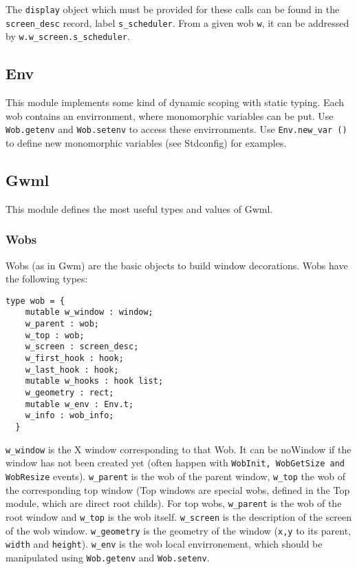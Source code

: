 \documentclass{book}
\begin{document}
 The {\tt display} object which must be provided for these calls can be
found in the {\tt screen\_desc} record, label {\tt s\_scheduler}. From a
given wob {\tt w}, it can be addressed by
 {\tt w.w\_screen.s\_scheduler}.

\subsection{\bf Env}

This module implements some kind of dynamic scoping with
static typing. Each wob contains an envirronment, where monomorphic
variables can be put. Use {\tt Wob.getenv} and {\tt Wob.setenv} to access
these envirronments. Use {\tt Env.new\_var ()} to define new monomorphic 
variables (see Stdconfig) for examples.

\subsection{\bf Gwml}


This module defines the most useful types and values  of Gwml.

\subsubsection{Wobs}

Wobs (as in Gwm) are the basic objects to build window decorations.
Wobs have the following types:

\begin{verbatim}
type wob = {
    mutable w_window : window;
    w_parent : wob;
    w_top : wob;
    w_screen : screen_desc;
    w_first_hook : hook;
    w_last_hook : hook;
    mutable w_hooks : hook list;
    w_geometry : rect;
    mutable w_env : Env.t;
    w_info : wob_info;
  }
\end{verbatim}

  {\tt w\_window} is the X window corresponding to that Wob. It can be noWindow
if the window has not been created yet (often happen with {\tt WobInit, WobGetSize
and WobResize} events). {\tt w\_parent} is the wob of the parent window,
{\tt w\_top} the wob of the corresponding top window (Top windows are special
wobs, defined in the Top module, which are direct root childs). For top 
wobs, {\tt w\_parent} is the wob of the root window and {\tt w\_top} is the
wob itself. {\tt w\_screen} is the description of the screen of the wob window.
{\tt w\_geometry} is the geometry of the window ({\tt x,y} to its parent, {
\tt width} and {\tt height}). {\tt w\_env} is the wob local envirronement, 
which should be manipulated using {\tt Wob.getenv} and {\tt Wob.setenv}.
\end{document}
